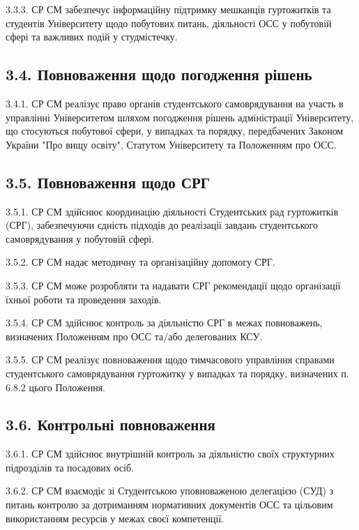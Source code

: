     3.3.3. СР СМ забезпечує інформаційну підтримку мешканців гуртожитків та студентів Університету щодо побутових питань, діяльності ОСС у побутовій сфері та важливих подій у студмістечку.

\subsection*{3.4. Повноваження щодо погодження рішень}
    3.4.1. СР СМ реалізує право органів студентського самоврядування на участь в управлінні Університетом шляхом погодження рішень адміністрації Університету, що стосуються побутової сфери, у випадках та порядку, передбачених Законом України "Про вищу освіту", Статутом Університету та Положенням про ОСС.

\subsection*{3.5. Повноваження щодо СРГ}
    3.5.1. СР СМ здійснює координацію діяльності Студентських рад гуртожитків (СРГ), забезпечуючи єдність підходів до реалізації завдань студентського самоврядування у побутовій сфері.

    3.5.2. СР СМ надає методичну та організаційну допомогу СРГ.

    3.5.3. СР СМ може розробляти та надавати СРГ рекомендації щодо організації їхньої роботи та проведення заходів.

    3.5.4. СР СМ здійснює контроль за діяльністю СРГ в межах повноважень, визначених Положенням про ОСС та/або делегованих КСУ.

    3.5.5. СР СМ реалізує повноваження щодо тимчасового управління справами студентського самоврядування гуртожитку у випадках та порядку, визначених п. 6.8.2 цього Положення.

\subsection*{3.6. Контрольні повноваження}
    3.6.1. СР СМ здійснює внутрішній контроль за діяльністю своїх структурних підрозділів та посадових осіб.

    3.6.2. СР СМ взаємодіє зі Студентською уповноваженою делегацією (СУД) з питань контролю за дотриманням нормативних документів ОСС та цільовим використанням ресурсів у межах своєї компетенції.

